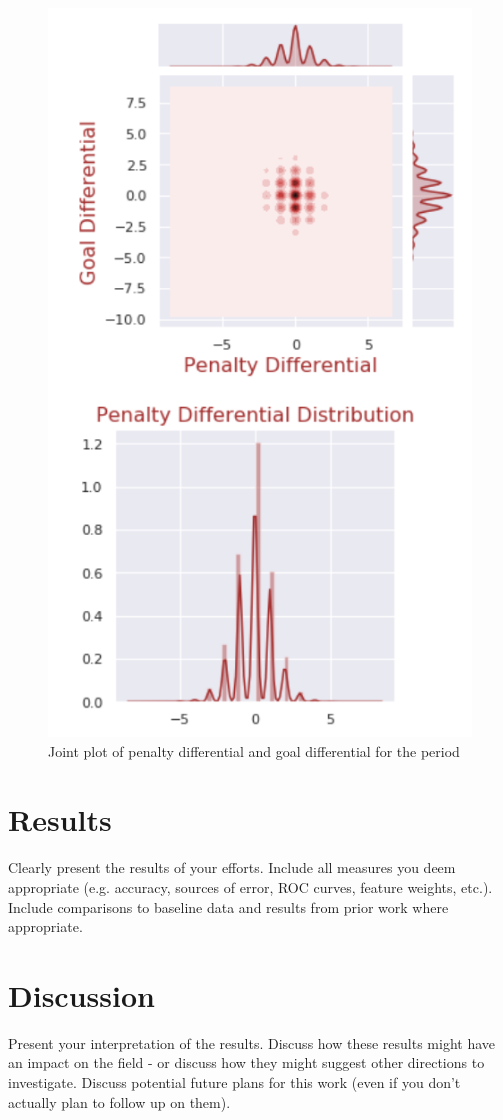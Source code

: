 \documentclass[twocolumn,letterpaper,12pt,notitlepage]{article}
\begin{document}
\begin{figure}[htp]
\centering
\includegraphics[width=\linewidth]{joint}
\caption{Joint plot of penalty differential and goal differential for the period}
\label{fig:2}
\end{figure}


\section{Results}
Clearly present the results of your efforts. Include all measures you deem appropriate (e.g. accuracy, sources of error, ROC curves, feature weights, etc.). Include comparisons to baseline data and results from prior work where appropriate.

\section{Discussion}
Present your interpretation of the results. Discuss how these results might have an impact on the field - or discuss how they might suggest other directions to investigate. Discuss potential future plans for this work (even if you don't actually plan to follow up on them).
\end{document}
